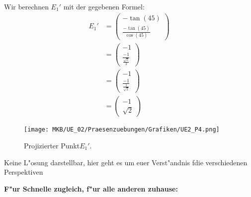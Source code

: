 \begin{Loesung}
\begin{Teilloesungen}
\usetikzlibrary{calc}

\item Wir berechnen $E_1'$ mit der gegebenen 	Formel: \\
	\begin{align*}
		E_1' &= \begin{pmatrix}- \tan(45)\\  \frac{- \tan(45)}{{\cos(45)}}\end{pmatrix}\\	
		&= \begin{pmatrix}-1\\  \frac{-1}{\frac{\sqrt{2}}{2}}\end{pmatrix}\\
		&= \begin{pmatrix}-1\\  \frac{-1}{\frac{1}{\sqrt{2}}}\end{pmatrix}\\	
		&= \begin{pmatrix}-1\\ \sqrt{2} \end{pmatrix}
	\end{align*}

\begin{figure}[H]
	\centering
	\texttt{[image: MKB/UE\_02/Praesenzuebungen/Grafiken/UE2\_P4.png]}
	\caption{Projizierter Punkt$E_1'$.}
	\label{fig.P4}
\end{figure}
	
\item Keine L"osung darstellbar, hier geht es um euer Verst"andnis f\ur die verschiedenen Perspektiven
\end{Teilloesungen}
\end{Loesung}
%
\small
\textbf{F"ur Schnelle zugleich, f"ur alle anderen zuhause:}

